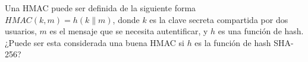 Una HMAC puede ser definida de la siguiente forma $\textit{HMAC}(k, m) = h(k \|
m)$, donde $k$ es la clave secreta compartida por dos usuarios, $m$ es el
mensaje que se necesita autentificar, y $h$ es una función de
hash. ¿Puede ser esta considerada una buena HMAC si $h$ es la función de
hash SHA-256?
